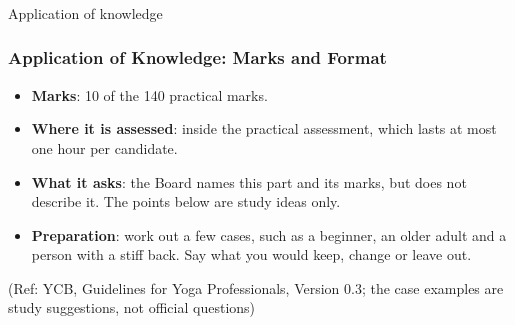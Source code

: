 \begin{frame}[fragile]\frametitle{}
\begin{center}
{\Large Application of knowledge }
\end{center}
\end{frame}


\begin{frame}[fragile]\frametitle{Application of Knowledge: Marks and Format}
\begin{itemize}
\item \textbf{Marks}: 10 of the 140 practical marks.
\item \textbf{Where it is assessed}: inside the practical assessment, which lasts at most one hour per candidate.
\item \textbf{What it asks}: the Board names this part and its marks, but does not describe it. The points below are study ideas only.
\item \textbf{Preparation}: work out a few cases, such as a beginner, an older adult and a person with a stiff back. Say what you would keep, change or leave out.
\end{itemize}
{\tiny (Ref: YCB, Guidelines for Yoga Professionals, Version 0.3; the case examples are study suggestions, not official questions)}
\end{frame}

